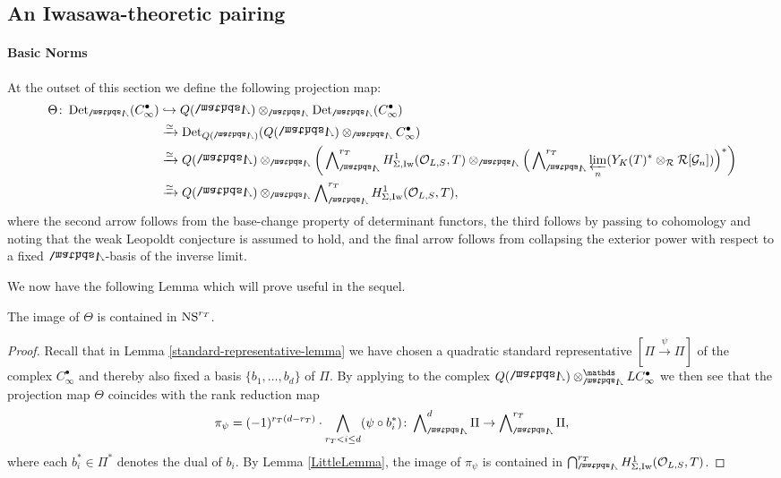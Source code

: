 \documentclass[a4paper, 
headsepline=off, DIV=12, titlepage=false]{scrartcl}
\begin{document}
\subsection{An Iwasawa-theoretic pairing}

\paragraph{Basic Norms}

At the outset of this section we define the following projection map:
\begin{align*}
    \Theta \: \Det_{\bLambda}(C^\bullet_\infty) &\hookrightarrow Q(\bLambda) \otimes_{\bLambda} \Det_{\bLambda}(C^ \bullet_\infty)\\
    &\xrightarrow{\simeq} \Det_{Q(\bLambda)}(Q(\bLambda) \otimes_{\bLambda} C^\bullet_\infty)\\
    &\xrightarrow{\simeq} Q(\bLambda) \otimes_{\bLambda} \bigg(\exprod_{\bLambda}^{r_T} H^1_{\Sigma, \Iw}(\cO_{L,S}, T) \otimes_{\bLambda} \Big(\exprod_{\bLambda}^{r_T} \varprojlim_n (Y_K(T)^* \otimes_\cR \cR[\cG_n])\Big)^*\bigg)\\
    &\xrightarrow{\simeq} Q(\bLambda) \otimes_{\bLambda} \exprod_{\bLambda}^{r_T} H^1_{\Sigma, \Iw}(\cO_{L,S}, T),
\end{align*}
where the second arrow follows from the base-change property of determinant functors, the third follows by passing to cohomology and noting that the weak Leopoldt conjecture is assumed to hold, and the final arrow follows from collapsing the exterior power with respect to a fixed $\bLambda$-basis of the inverse limit.

We now have the following Lemma which will prove useful in the sequel.

\begin{lemma} 
\label{projection-map-lemma-1}
   The image of $\Theta$ is contained in $\mathrm{NS}^{r_T}$.
\end{lemma}

\begin{proof}
   Recall that in Lemma \ref{standard-representative-lemma} we have chosen a quadratic standard representative $[\Pi \stackrel{\psi}{\longrightarrow} \Pi]$ of the complex $C^\bullet_\infty$ and thereby also fixed a basis $\{ b_1, \dots, b_d \}$ of $\Pi$. 
    By applying \cite[Lem.\@ A.7]{EulerSystemsSagaI} to the complex $Q (\bLambda) \otimes_\bLambda^\mathbb{L} C^\bullet_\infty$  we then see that the projection map $\Theta$ coincides with the rank reduction map
    \[
    \pi_{\psi} = (-1)^{r_T (d - r_T)} \cdot \bigwedge_{r_T < i \leq d} (\psi \circ b_i^\ast) \: \exprod^{d}_\bLambda \Pi \to \exprod^{r_T}_\bLambda \Pi,
    \]
    where each $b_i^\ast \in \Pi^\ast$ denotes the dual of $b_i$.
    By Lemma \ref{LittleLemma}, the image of $\pi_\psi$
    is contained in $\bidual^{r_T}_\bLambda H^1_{\Sigma, \Iw} (\bigO_{L, S}, T)$.
\end{proof}
\end{document}
